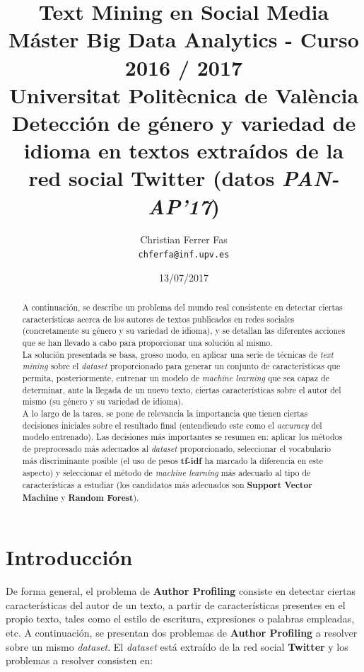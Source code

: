 \documentclass[11pt,a4paper]{article}
\title{Text Mining en Social Media\\
M\'aster Big Data Analytics - Curso 2016 / 2017\\
Universitat Polit\`ecnica de Val\`encia\\
\hfill \break
\large Detecci\'on de g\'enero y variedad de idioma en textos extra\'idos de la red social Twitter (datos \textit{PAN-AP'17})
}
\author{Christian Ferrer Fas \\
{\tt chferfa@inf.upv.es} \\}
\date{13/07/2017}
\begin{document}
\sloppy
\maketitle

\begin{abstract}

A continuaci\'on, se describe un problema del mundo real consistente en detectar ciertas caracter\'isticas acerca de los autores de textos publicados en redes sociales (concretamente su g\'enero y su variedad de idioma), y se detallan las diferentes acciones que se han llevado a cabo para proporcionar una soluci\'on al mismo.\\
La soluci\'on presentada se basa, grosso modo, en aplicar una serie de t\'ecnicas de \textit{text mining} sobre el \textit{dataset} proporcionado para generar un conjunto de caracter\'isticas que permita, posteriormente, entrenar un modelo de \textit{machine learning} que sea capaz de determinar, ante la llegada de un nuevo texto, ciertas caracter\'isticas sobre el autor del mismo (su g\'enero y su variedad de idioma).\\
A lo largo de la tarea, se pone de relevancia la importancia que tienen ciertas decisiones iniciales sobre el resultado final (entendiendo este como el \textit{accuracy} del modelo entrenado). Las decisiones m\'as importantes se resumen en: aplicar los m\'etodos de preprocesado m\'as adecuados al \textit{dataset} proporcionado, seleccionar el vocabulario m\'as discriminante posible (el uso de pesos \textbf{tf-idf} ha marcado la diferencia en este aspecto) y seleccionar el m\'etodo de \textit{machine learning} m\'as adecuado al tipo de caracter\'isticas a estudiar (los candidatos m\'as adecuados son \textbf{Support Vector Machine} y \textbf{Random Forest}).

\end{abstract}

\section{Introducci\'on}

De forma general, el problema de \textbf{Author Profiling} consiste en detectar ciertas caracter\'isticas del autor de un texto, a partir de caracter\'isticas presentes en el propio texto, tales como el estilo de escritura, expresiones o palabras empleadas, etc.
A continuaci\'on, se presentan dos problemas de \textbf{Author Profiling} a resolver sobre un mismo \textit{dataset}.
El \textit{dataset} est\'a extra\'ido de la red social \textbf{Twitter} y los problemas a resolver consisten en:\\
\end{document}
